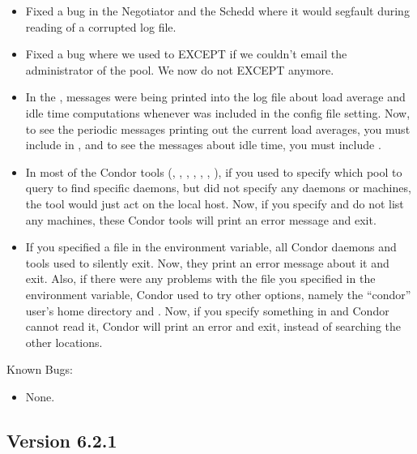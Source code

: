 \begin{itemize}
\item Fixed a bug in the Negotiator and the Schedd where it would segfault
during reading of a corrupted log file.

\item Fixed a bug where we used to EXCEPT if we couldn't email the
administrator of the pool. We now do not EXCEPT anymore.

\item In the , messages were being printed into the log
file about load average and idle time computations whenever
 was included in the  config
file setting.
Now, to see the periodic messages printing out the current load
averages, you must include  in , and
to see the messages about idle time, you must include .

\item In most of the Condor tools (, ,
, , ,
, ), if you used  to
specify which pool to query to find specific daemons, but did not
specify any daemons or machines, the tool would just act on the local
host.
Now, if you specify  and do not list any machines, these
Condor tools will print an error message and exit.

\item If you specified a file in the  environment
variable, all Condor daemons and tools used to silently exit.
Now, they print an error message about it and exit.
Also, if there were any problems with the file you specified in 
the  environment variable, Condor used to try
other options, namely the ``condor'' user's home directory and
.
Now, if you specify something in  and Condor
cannot read it, Condor will print an error and exit, instead of
searching the other locations.

\end{itemize}

\noindent Known Bugs:
\begin{itemize}
\item None.
\end{itemize}

\subsection{\label{sec:New-6-2-1}Version 6.2.1}

